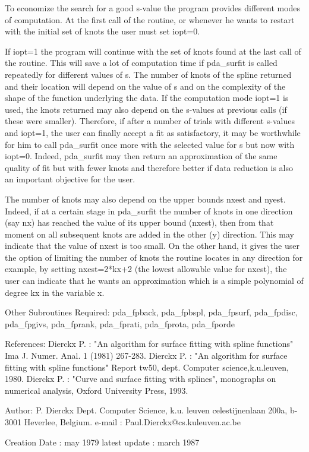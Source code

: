 \documentclass[11pt,twoside,nolof]{starlink}
\begin{document}
\begin{terminalv}
   To economize the search for a good s-value the program provides
   different modes of computation. At the first call of the routine, or
   whenever he wants to restart with the initial set of knots the user
   must set iopt=0.

   If iopt=1 the program will continue with the set of knots found at the
   last call of the routine. This will save a lot of computation time if
   pda_surfit is called repeatedly for different values of s. The number
   of knots of the spline returned and their location will depend on the
   value of s and on the complexity of the shape of the function
   underlying the data. If the computation mode iopt=1 is used, the knots
   returned may also depend on the s-values at previous calls (if these
   were smaller). Therefore, if after a number of trials with different
   s-values and iopt=1, the user can finally accept a fit as satisfactory,
   it may be worthwhile for him to call pda_surfit once more with the
   selected value for s but now with iopt=0. Indeed, pda_surfit may then
   return an approximation of the same quality of fit but with fewer knots
   and therefore better if data reduction is also an important objective
   for the user.

   The number of knots may also depend on the upper bounds nxest and
   nyest. Indeed, if at a certain stage in pda_surfit the number of knots
   in one direction (say nx) has reached the value of its upper bound
   (nxest), then from that moment on all subsequent knots are added in the
   other (y) direction. This may indicate that the value of nxest is too
   small. On the other hand, it gives the user the option of limiting the
   number of knots the routine locates in any direction for example, by
   setting nxest=2*kx+2 (the lowest allowable value for nxest), the user
   can indicate that he wants an approximation which is a simple
   polynomial of degree kx in the variable x.

Other Subroutines Required:
   pda_fpback, pda_fpbspl, pda_fpsurf, pda_fpdisc, pda_fpgivs, pda_fprank,
   pda_fprati, pda_fprota, pda_fporde

References:
   Dierckx P. : "An algorithm for surface fitting with spline functions"
                Ima J. Numer. Anal. 1 (1981) 267-283.
   Dierckx P. : "An algorithm for surface fitting with spline functions"
                Report tw50, dept. Computer science,k.u.leuven, 1980.
   Dierckx P. : "Curve and surface fitting with splines", monographs on
                numerical analysis, Oxford University Press, 1993.

Author:
   P. Dierckx
   Dept. Computer Science, k.u. leuven
   celestijnenlaan 200a, b-3001 Heverlee, Belgium.
   e-mail : Paul.Dierckx@cs.kuleuven.ac.be

Creation Date : may 1979
   latest update : march 1987
\end{terminalv}
\end{document}
